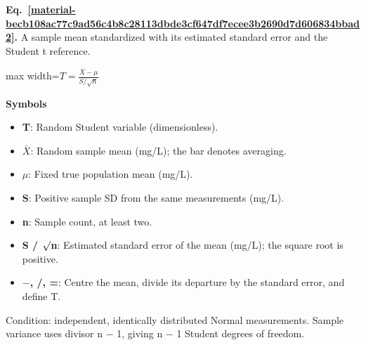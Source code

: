 \documentclass[11pt,a4paper]{article}
\begin{document}
\par\medskip
\noindent\begin{minipage}{\linewidth}
\label{material-becb108ac77c9ad56c4b8c28113dbde3cf647df7ecee3b2690d7d606834bbad2}
\noindent\textbf{Eq.~\ref*{material-becb108ac77c9ad56c4b8c28113dbde3cf647df7ecee3b2690d7d606834bbad2}.} A sample mean standardized with its estimated standard error and the Student t reference.\par\nopagebreak
\begin{center}\begin{adjustbox}{max width=\linewidth}$\displaystyle T=\frac{\bar X-\mu}{S/\sqrt n}$\end{adjustbox}\end{center}

\par\noindent\textbf{Symbols}

\begin{itemize}\setlength{\itemsep}{1pt}\setlength{\parsep}{0pt}
\item \textbf{T}: Random Student variable (dimensionless).
\item \textbf{\ensuremath{\bar{X}}}: Random sample mean (mg/L); the bar denotes averaging.
\item \textbf{\ensuremath{\mu}}: Fixed true population mean (mg/L).
\item \textbf{S}: Positive sample SD from the same measurements (mg/L).
\item \textbf{n}: Sample count, at least two.
\item \textbf{S / \ensuremath{\sqrt{\vphantom{x}}}n}: Estimated standard error of the mean (mg/L); the square root is positive.
\item \textbf{\ensuremath{-}, /, =}: Centre the mean, divide its departure by the standard error, and define T.
\end{itemize}

Condition: independent, identically distributed Normal measurements. Sample variance uses divisor n \ensuremath{-} 1, giving n \ensuremath{-} 1 Student degrees of freedom.

\end{minipage}\par
\medskip
\end{document}
